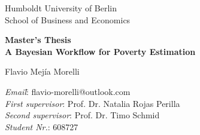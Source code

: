 \thispagestyle{empty}

\begin{center}

\vspace*{19mm}

{\LARGE Humboldt University of Berlin}\\
{\LARGE School of Business and Economics\\}



\vspace*{3cm}



\vspace{1cm}

{\large\textbf{Master's Thesis}}\\ [2mm]
\vspace{2cm}
{\Large\textbf{A Bayesian Workflow for Poverty Estimation}}\\ [2mm]

\vspace*{1mm}

\vspace{2.5cm}

{\Large Flavio Mejía Morelli}\\[3mm]



\vspace{2cm}
\parbox{120mm}{
\begin{large}
\begin{tabbing}

\textit{Email}:\= \hspace{1cm} flavio-morelli@outlook.com\\
\textit{First supervisor}:\> \hspace{2.7 cm} Prof. Dr. Natalia Rojas Perilla\\
\textit{Second supervisor}:\> \hspace{2.7 cm} Prof. Dr. Timo Schmid\\
\textit{Student Nr.}:\> \hspace{1.3 cm} 608727\\



\end{tabbing}
\end{large}}
\end{center}
